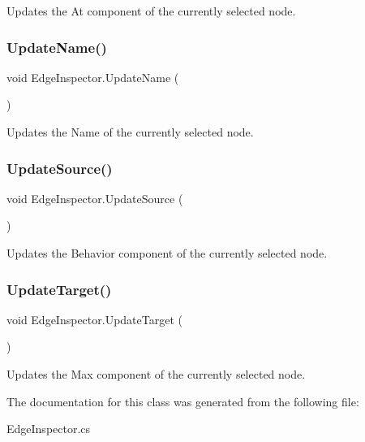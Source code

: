 Updates the At component of the currently selected node. 

\mbox{\label{class_edge_inspector_a156a07db25d54510f00a336943474fcc}} 
\subsubsection{\texorpdfstring{Update\+Name()}{UpdateName()}}
{\footnotesize\ttfamily void Edge\+Inspector.\+Update\+Name (\begin{DoxyParamCaption}{ }\end{DoxyParamCaption})}



Updates the Name of the currently selected node. 

\mbox{\label{class_edge_inspector_a513fd82ff3e791570874421df36ddd9f}} 
\subsubsection{\texorpdfstring{Update\+Source()}{UpdateSource()}}
{\footnotesize\ttfamily void Edge\+Inspector.\+Update\+Source (\begin{DoxyParamCaption}{ }\end{DoxyParamCaption})}



Updates the Behavior component of the currently selected node. 

\mbox{\label{class_edge_inspector_a6e6050bef0c14197e73f848ebcab7ecf}} 
\subsubsection{\texorpdfstring{Update\+Target()}{UpdateTarget()}}
{\footnotesize\ttfamily void Edge\+Inspector.\+Update\+Target (\begin{DoxyParamCaption}{ }\end{DoxyParamCaption})}



Updates the Max component of the currently selected node. 



The documentation for this class was generated from the following file\+:\begin{DoxyCompactItemize}
\item 
Edge\+Inspector.\+cs\end{DoxyCompactItemize}
